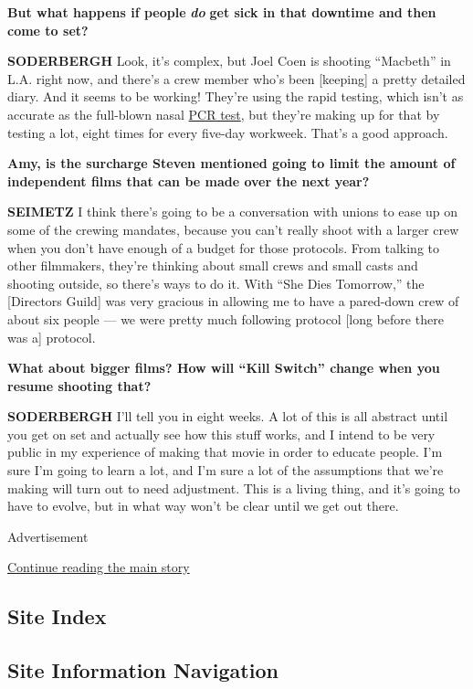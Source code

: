 \textbf{But what happens if people} \emph{\textbf{do}} \textbf{get sick
in that downtime and then come to set?}

\textbf{SODERBERGH} Look, it's complex, but Joel Coen is shooting
``Macbeth'' in L.A. right now, and there's a crew member who's been
{[}keeping{]} a pretty detailed diary. And it seems to be working!
They're using the rapid testing, which isn't as accurate as the
full-blown nasal
\href{https://www.nytimes.com/2020/07/06/health/fast-coronavirus-tests.html}{PCR
test}, but they're making up for that by testing a lot, eight times for
every five-day workweek. That's a good approach.

\textbf{Amy, is the surcharge Steven mentioned going to limit the amount
of independent films that can be made over the next year?}

\textbf{SEIMETZ} I think there's going to be a conversation with unions
to ease up on some of the crewing mandates, because you can't really
shoot with a larger crew when you don't have enough of a budget for
those protocols. From talking to other filmmakers, they're thinking
about small crews and small casts and shooting outside, so there's ways
to do it. With ``She Dies Tomorrow,'' the {[}Directors Guild{]} was very
gracious in allowing me to have a pared-down crew of about six people
--- we were pretty much following protocol {[}long before there was a{]}
protocol.

\textbf{What about bigger films? How will ``Kill Switch'' change when
you resume shooting that?}

\textbf{SODERBERGH} I'll tell you in eight weeks. A lot of this is all
abstract until you get on set and actually see how this stuff works, and
I intend to be very public in my experience of making that movie in
order to educate people. I'm sure I'm going to learn a lot, and I'm sure
a lot of the assumptions that we're making will turn out to need
adjustment. This is a living thing, and it's going to have to evolve,
but in what way won't be clear until we get out there.

Advertisement

\protect\hyperlink{after-bottom}{Continue reading the main story}

\hypertarget{site-index}{%
\subsection{Site Index}\label{site-index}}

\hypertarget{site-information-navigation}{%
\subsection{Site Information
Navigation}\label{site-information-navigation}}

